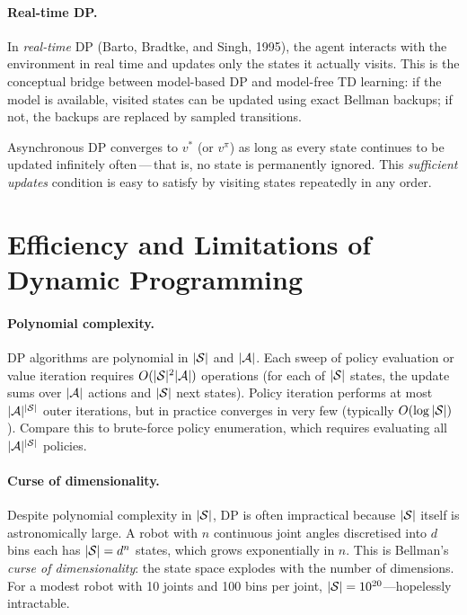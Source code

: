 \paragraph{Real-time DP.}
In \emph{real-time} DP (Barto, Bradtke, and Singh, 1995), the agent interacts with the environment in real time and updates only the states it actually visits.  This is the conceptual bridge between model-based DP and model-free TD learning: if the model is available, visited states can be updated using exact Bellman backups; if not, the backups are replaced by sampled transitions.

\begin{remark}
Asynchronous DP converges to $v^*$ (or $v^\pi$) as long as every state continues to be updated infinitely often\,---\,that is, no state is permanently ignored.  This \emph{sufficient updates} condition is easy to satisfy by visiting states repeatedly in any order.
\end{remark}

\section{Efficiency and Limitations of Dynamic Programming}
\label{sec:dp-limitations}

\paragraph{Polynomial complexity.}
DP algorithms are polynomial in $|\mathcal{S}|$ and $|\mathcal{A}|$.  Each sweep of policy evaluation or value iteration requires $O(|\mathcal{S}|^2 |\mathcal{A}|)$ operations (for each of $|\mathcal{S}|$ states, the update sums over $|\mathcal{A}|$ actions and $|\mathcal{S}|$ next states).  Policy iteration performs at most $|\mathcal{A}|^{|\mathcal{S}|}$ outer iterations, but in practice converges in very few (typically $O(\log |\mathcal{S}|)$).  Compare this to brute-force policy enumeration, which requires evaluating all $|\mathcal{A}|^{|\mathcal{S}|}$ policies.

\paragraph{Curse of dimensionality.}
Despite polynomial complexity in $|\mathcal{S}|$, DP is often impractical because $|\mathcal{S}|$ itself is astronomically large.  A robot with $n$ continuous joint angles discretised into $d$ bins each has $|\mathcal{S}| = d^n$ states, which grows exponentially in $n$.  This is Bellman's \emph{curse of dimensionality}: the state space explodes with the number of dimensions.  For a modest robot with 10 joints and 100 bins per joint, $|\mathcal{S}| = 10^{20}$---hopelessly intractable.

